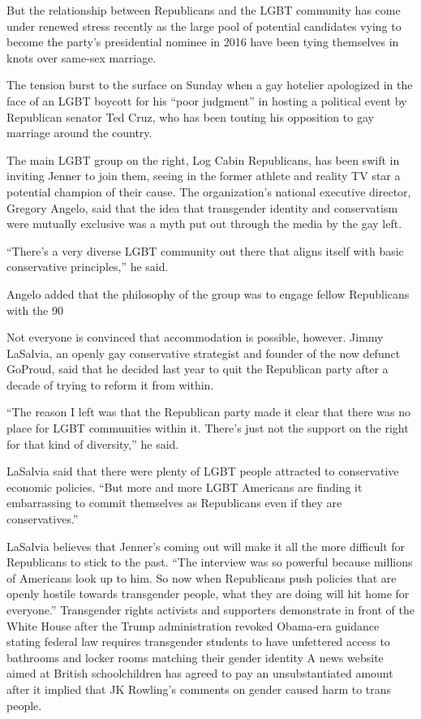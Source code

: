 But the relationship between Republicans and the LGBT community has come under renewed stress recently as the large pool of potential candidates vying to become the party’s presidential nominee in 2016 have been tying themselves in knots over same-sex marriage.

The tension burst to the surface on Sunday when a gay hotelier apologized in the face of an LGBT boycott for his “poor judgment” in hosting a political event by Republican senator Ted Cruz, who has been touting his opposition to gay marriage around the country.

The main LGBT group on the right, Log Cabin Republicans, has been swift in inviting Jenner to join them, seeing in the former athlete and reality TV star a potential champion of their cause. The organization’s national executive director, Gregory Angelo, said that the idea that transgender identity and conservatism were mutually exclusive was a myth put out through the media by the gay left.

“There’s a very diverse LGBT community out there that aligns itself with basic conservative principles,” he said.

Angelo added that the philosophy of the group was to engage fellow Republicans with the 90%

Not everyone is convinced that accommodation is possible, however. Jimmy LaSalvia, an openly gay conservative strategist and founder of the now defunct GoProud, said that he decided last year to quit the Republican party after a decade of trying to reform it from within.

“The reason I left was that the Republican party made it clear that there was no place for LGBT communities within it. There’s just not the support on the right for that kind of diversity,” he said.

LaSalvia said that there were plenty of LGBT people attracted to conservative economic policies. “But more and more LGBT Americans are finding it embarrassing to commit themselves as Republicans even if they are conservatives.”

LaSalvia believes that Jenner’s coming out will make it all the more difficult for Republicans to stick to the past. “The interview was so powerful because millions of Americans look up to him. So now when Republicans push policies that are openly hostile towards transgender people, what they are doing will hit home for everyone.”
Transgender rights activists and supporters demonstrate in front of the White House after the Trump administration revoked Obama-era guidance stating federal law requires transgender students to have unfettered access to bathrooms and locker rooms matching their gender identity
A news website aimed at British schoolchildren has agreed to pay an unsubstantiated amount after it implied that JK Rowling’s comments on gender caused harm to trans people.

